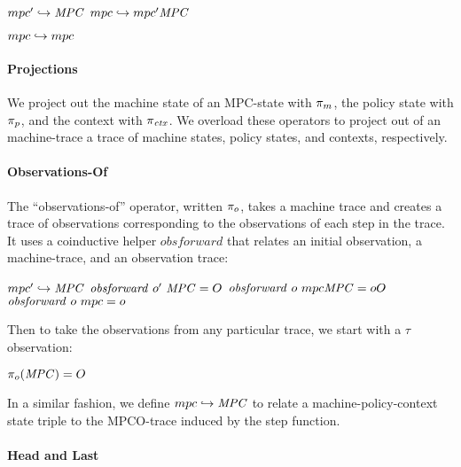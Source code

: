 \documentclass[acmsmall,review,anonymous]{acmart}\settopmatter{printfolios=true,printccs=false,printacmref=false}
\begin{document}
\begin{minipage}{.4\textwidth}
            {\(mpc' \hookrightarrow \mathit{MPC}\)}
            {\(mpc \hookrightarrow mpc' \mathit{MPC}\)}%
\end{minipage}
\begin{minipage}{.4\textwidth}
\judgment[Default]
         {}
         {\(mpc \hookrightarrow mpc\)}
\end{minipage}
%

\paragraph*{Projections}

We project out the machine state of an MPC-state with \(\pi_m\), the
policy state with \(\pi_p\), and the context with \(\pi_{\mathit{ctx}}\). We overload
these operators to project out of an machine-trace a trace of machine states,
policy states, and contexts, respectively.

\paragraph*{Observations-Of}

The ``observations-of'' operator, written \(\pi_o\), takes a machine trace and
creates a trace of observations corresponding to the observations of each step in
the trace. It uses a coinductive helper \(\mathit{obsforward}\) that relates an
initial observation, a machine-trace, and an observation trace:

              {\(mpc' \hookrightarrow \mathit{MPC}\)}
              {\(\mathit{obsforward} ~ o' ~ \mathit{MPC} = O\)}
              {\(\mathit{obsforward} ~ o ~ mpc \mathit{MPC} = oO\)}%
\judgment{}
         {\(\mathit{obsforward} ~ o ~ mpc = o\)}

Then to take the observations from any particular trace, we start with a \(\tau\) observation:

         {\(\pi_o(\mathit{MPC}) = O\)}
\noindent

In a similar fashion, we define \(mpc \hookrightarrow \mathit{MPC}\)
to relate a machine-policy-context state triple to the MPCO-trace
induced by the step function.

\paragraph*{Head and Last}
\end{document}

